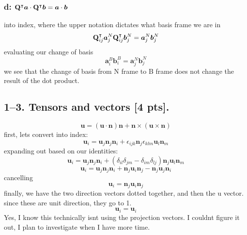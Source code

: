 \subsubsection*{d: $\mathbf{Q}^\intercal\bm{a} \cdot \mathbf{Q}^\intercal\bm{b} = \bm{a}\cdot\bm{b} $}
into index, where the upper notation dictates what basis frame we are in
\begin{equation}
    \mathbf{Q}^\intercal_{ij}\bm{a}_j^N \mathbf{Q}_{ij}^\intercal\bm{b}_j^N = \bm{a}_j^N\bm{b} _j^N
\end{equation}
evaluating our change of basis
\begin{equation}
   \boxed{ \bm{a}_i^B \bm{b}_i^B = \bm{a}_j^N\bm{b} _j^N}
\end{equation}
we see that the change of basis from N frame to B frame does not change the result of the dot product.

\bigskip
\subsection*{1--3. \textbf{Tensors and vectors} [4 pts].}
\begin{equation}
    \bm{u} = (\bm{u} \cdot \bm{n}) \bm{n} + \bm{n} \times (\bm{u} \times \bm{n} )
\end{equation}
first, lets convert into index:
\begin{equation}
    \bm{u}_i = \bm{u}_j\bm{n}_j\bm{n}_i+\epsilon_{ijk}\bm{n}_j\epsilon_{klm}\bm{u}_l\bm{n}_m
\end{equation}
expanding out based on our identities:
\begin{equation}
    \bm{u}_i = \bm{u}_j\bm{n}_j\bm{n}_i+(\delta_{il}\delta_{jm}-\delta_{im}\delta_{lj})\bm{n}_j\bm{u}_l\bm{n}_m
\end{equation}
\begin{equation}
    \bm{u}_i = \bm{u}_j\bm{n}_j\bm{n}_i+\bm{n}_j\bm{u}_i\bm{n}_j-\bm{n}_j\bm{u}_j\bm{n}_i
\end{equation}
cancelling
\begin{equation}
    \bm{u}_i = \bm{n}_j\bm{u}_i\bm{n}_j
\end{equation}
finally, we have the two direction vectors dotted together, and then the u vector. since these are unit direction, they go to 1.
\begin{equation}
    \boxed{\bm{u}_i = \bm{u}_i}
\end{equation}
Yes, I know this technically isnt using the projection vectors. I couldnt figure it out, I plan to investigate when I have more time.

